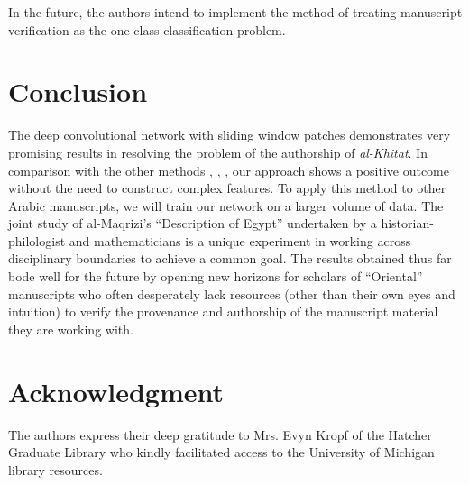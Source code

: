 \documentclass[conference]{IEEEtran}
\begin{document}
In the future, the authors intend to implement the method of treating manuscript verification as the one-class classification problem.

\section{Conclusion}

The deep convolutional network with sliding window patches demonstrates very promising results in resolving the problem of the authorship of {\it al-Khitat}. In comparison with the other methods \cite{MBulacu}, \cite{MBulacu1}, \cite{DFecker}, \cite{Salvador} our approach shows a positive outcome without the need to construct complex features. To apply this method to other Arabic manuscripts, we will train our network on a larger volume of data. The joint study of al-Maqrizi's ``Description of Egypt'' undertaken by a historian-philologist and mathematicians is a unique experiment in working across disciplinary boundaries to achieve a common goal. The results obtained thus far bode well for the future by opening new horizons for scholars of ``Oriental'' manuscripts who often desperately lack resources (other than their own eyes and intuition) to verify the provenance and authorship of the manuscript material they are working with.

\section*{Acknowledgment}
The authors express their deep gratitude to Mrs. Evyn Kropf of the Hatcher Graduate Library who kindly facilitated access to the University of Michigan library resources.
 
\end{document}
